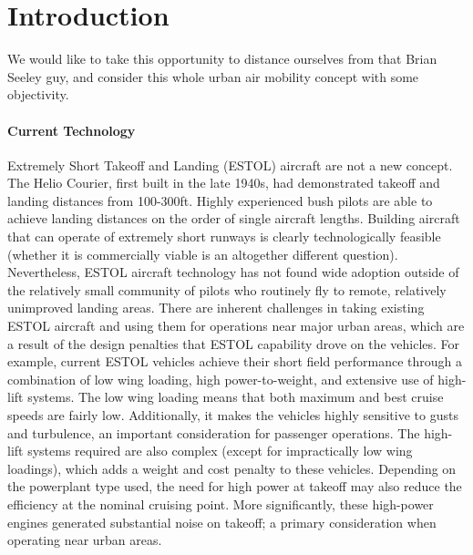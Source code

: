 \documentclass[]{aiaa-tc}%
\begin{document}
\section{Introduction}
We would like to take this opportunity to distance ourselves from that Brian Seeley guy, and consider this whole urban air mobility concept with some objectivity. 

\paragraph{Current Technology} Extremely Short Takeoff and Landing (ESTOL) aircraft are not a new concept.  The Helio Courier, first built in the late 1940s, had demonstrated takeoff and landing distances from 100-300ft.  Highly experienced bush pilots are able to achieve landing distances on the order of single aircraft lengths.  Building aircraft that can operate of extremely short runways is clearly technologically feasible (whether it is commercially viable is an altogether different question).  Nevertheless, ESTOL aircraft technology has not found wide adoption outside of the relatively small community of pilots who routinely fly to remote, relatively unimproved landing areas.   There are inherent challenges in taking existing ESTOL aircraft and using them for operations near major urban areas, which are a result of the design penalties that ESTOL capability drove on the vehicles.  
For example, current ESTOL vehicles achieve their short field performance through a combination of low wing loading, high power-to-weight, and extensive use of high-lift systems.  The low wing loading means that both maximum and best cruise speeds are fairly low.  Additionally, it makes the vehicles highly sensitive to gusts and turbulence, an important consideration for passenger operations.   The high-lift systems required are also complex (except for impractically low wing loadings), which adds a weight and cost penalty to these vehicles.  Depending on the powerplant type used, the need for high power at takeoff may also reduce the efficiency at the nominal cruising point.  More significantly, these high-power engines generated substantial noise on takeoff; a primary consideration when operating near urban areas. 
\end{document}
